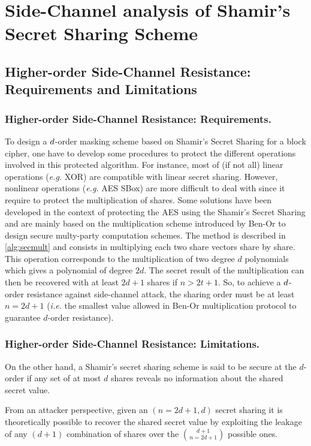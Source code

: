 \documentclass{llncs}
\begin{document}
\section{Side-Channel analysis of Shamir's Secret Sharing Scheme}
\subsection{Higher-order Side-Channel Resistance: Requirements and Limitations}
\subsubsection{Higher-order Side-Channel Resistance: Requirements.} To design a $d$\myth-order masking scheme based on Shamir's Secret Sharing for a block cipher, one have to develop some procedures to protect the different operations involved in this protected algorithm. For instance, most of (if not all) linear operations (\emph{e.g.} XOR) are compatible with linear secret sharing. However, nonlinear operations (\emph{e.g.} AES SBox) are more difficult to deal with since it require to protect the multiplication of shares. Some solutions have been developed in the context of protecting the AES using the Shamir's Secret Sharing\cite{GM11,PR11,RP12} and are mainly based on the multiplication scheme introduced by
Ben-Or \etal to design secure multy-party computation schemes\cite{BGW88}.
The method is described in \ref{alg:secmult} and consists in multiplying each two share vectors share by share. This operation corresponds to the multiplication of two degree $d$ polynomials which gives a polynomial of degree $2d$. The secret result of the multiplication can then be recovered with at least $2d + 1$ shares if $n > 2t + 1$. 
So, to achieve a $d$\myth-order resistance against side-channel attack, the sharing order must be at least $n = 2d + 1$ (\emph{i.e.} the smallest value allowed in Ben-Or \etal multiplication protocol to guarantee $d$\myth-order resistance).

\subsubsection{Higher-order Side-Channel Resistance: Limitations.} On the other hand, a Shamir's secret sharing scheme is said to be secure at the $d$\myth-order if any set of at most $d$ shares reveals no information about the shared secret value. 

\begin{remark}
From an attacker perspective, given an $(n=2d+1,d)$ secret sharing it is theoretically possible to recover the shared secret value by exploiting the leakage of any $(d+1)$ combination of shares over the $d+1 \choose n=2d+1$ possible ones. 
\label{rmk:sca}
\end{remark}
\end{document}
